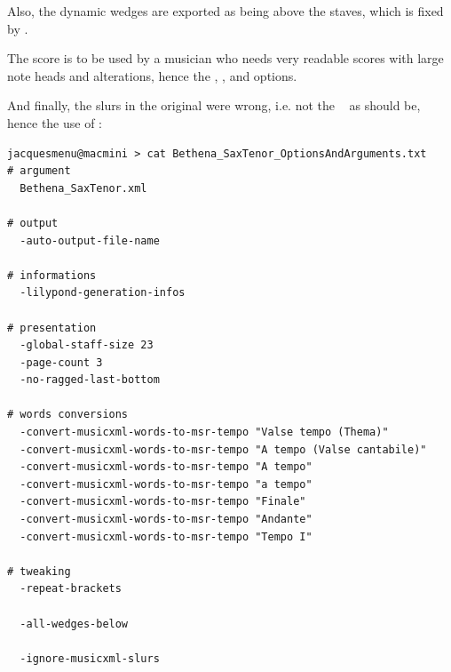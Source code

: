 Also, the dynamic wedges are exported as being above the staves, which is fixed by .

The score is to be used by a musician who needs very readable scores with large note heads and alterations, hence the , ,  and  options.

And finally, the slurs in the original were wrong, i.e. not the {\it \swing\ \phrase} as should be, hence the use of :
\begin{lstlisting}[language=Terminal]
jacquesmenu@macmini > cat Bethena_SaxTenor_OptionsAndArguments.txt
# argument
  Bethena_SaxTenor.xml

# output
  -auto-output-file-name

# informations
  -lilypond-generation-infos

# presentation
  -global-staff-size 23
  -page-count 3
  -no-ragged-last-bottom

# words conversions
  -convert-musicxml-words-to-msr-tempo "Valse tempo (Thema)"
  -convert-musicxml-words-to-msr-tempo "A tempo (Valse cantabile)"
  -convert-musicxml-words-to-msr-tempo "A tempo"
  -convert-musicxml-words-to-msr-tempo "a tempo"
  -convert-musicxml-words-to-msr-tempo "Finale"
  -convert-musicxml-words-to-msr-tempo "Andante"
  -convert-musicxml-words-to-msr-tempo "Tempo I"

# tweaking
  -repeat-brackets

  -all-wedges-below

  -ignore-musicxml-slurs
\end{lstlisting}

